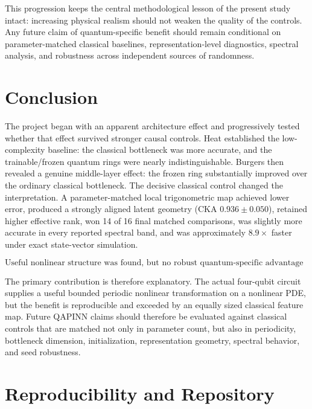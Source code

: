 \documentclass[10pt,a4paper]{article}
\begin{document}
This progression keeps the central methodological lesson of the present study intact: increasing physical realism should not weaken the quality of the controls. Any future claim of quantum-specific benefit should remain conditional on parameter-matched classical baselines, representation-level diagnostics, spectral analysis, and robustness across independent sources of randomness.

\section{Conclusion}

The project began with an apparent architecture effect and progressively tested whether that effect survived stronger causal controls. Heat established the low-complexity baseline: the classical bottleneck was more accurate, and the trainable/frozen quantum rings were nearly indistinguishable. Burgers then revealed a genuine middle-layer effect: the frozen ring substantially improved over the ordinary classical bottleneck. The decisive classical control changed the interpretation. A parameter-matched local trigonometric map achieved lower error, produced a strongly aligned latent geometry (CKA $0.936\pm0.050$), retained higher effective rank, won 14 of 16 final matched comparisons, was slightly more accurate in every reported spectral band, and was approximately $8.9\times$ faster under exact state-vector simulation.

\begin{equation}
\boxed{\text{Useful nonlinear structure was found, but no robust quantum-specific advantage was demonstrated.}}
\end{equation}

The primary contribution is therefore explanatory. The actual four-qubit circuit supplies a useful bounded periodic nonlinear transformation on a nonlinear PDE, but the benefit is reproducible and exceeded by an equally sized classical feature map. Future QAPINN claims should therefore be evaluated against classical controls that are matched not only in parameter count, but also in periodicity, bottleneck dimension, initialization, representation geometry, spectral behavior, and seed robustness.

\section*{Reproducibility and Repository}
\end{document}
